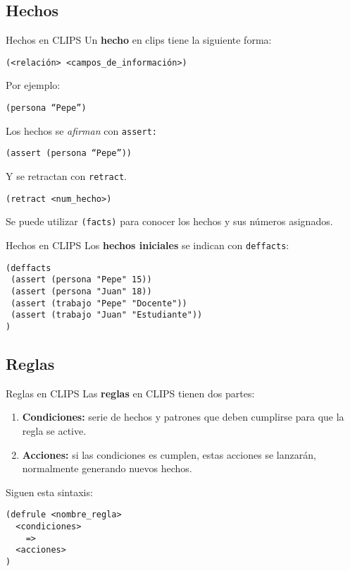 \documentclass[smaller,spanish,xcolor=svgnames]{beamer}
\begin{document}
\subsection{Hechos}

\begin{frame}{Hechos en CLIPS}
Un \textbf{hecho} en clips tiene la siguiente forma:

\texttt{(<relación> <campos\_de\_información>)}

\bigskip

Por ejemplo:

\texttt{(persona ``Pepe'')}

\bigskip

Los hechos se \textit{afirman} con \texttt{assert:}

\texttt{(assert (persona ``Pepe''))}

\bigskip

Y se retractan con \texttt{retract}. 

\texttt{(retract <num\_hecho>)}

\medskip

Se puede utilizar \texttt{(facts)} para conocer los hechos y sus números
asignados.
  
\end{frame}

\begin{frame}[fragile]{Hechos en CLIPS}
Los \textbf{hechos iniciales} se indican con \texttt{deffacts}:
\begin{verbatim}
(deffacts
 (assert (persona "Pepe" 15))
 (assert (persona "Juan" 18))
 (assert (trabajo "Pepe" "Docente"))
 (assert (trabajo "Juan" "Estudiante"))
)
\end{verbatim}  
\end{frame}

\subsection{Reglas}

\begin{frame}[fragile]{Reglas en CLIPS}
  Las \textbf{reglas} en CLIPS tienen dos partes:
  \begin{enumerate}
  \item \textbf{Condiciones:} serie de hechos y patrones que deben cumplirse
    para que la regla se active.
  \item \textbf{Acciones:} si las condiciones es cumplen, estas acciones se
    lanzarán, normalmente generando nuevos hechos.
  \end{enumerate}

\bigskip

Siguen esta sintaxis:
\begin{verbatim}
(defrule <nombre_regla>
  <condiciones>
    =>
  <acciones>
)
\end{verbatim}
\end{frame}
\end{document}

